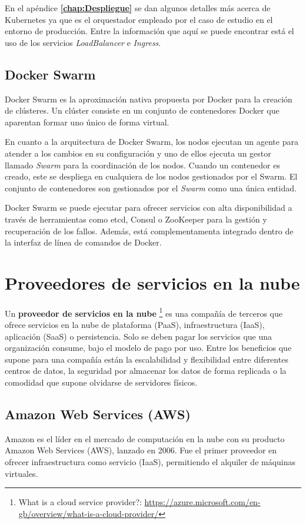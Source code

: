 \documentclass[11pt,spanish,listoffigures]{tfgetsinf}
\begin{document}
En el apéndice \textbf{\ref{chap:Despliegue} } se dan algunos detalles más acerca de Kubernetes ya que es el orquestador empleado por el caso de estudio en el entorno de producción. Entre la información que aquí se puede encontrar está el uso de los servicios \textit{LoadBalancer} e \textit{Ingress}.

\subsection{Docker Swarm}

Docker Swarm \cite{DeAlfonso2017} es la aproximación nativa propuesta por Docker para la creación de clústeres. Un clúster consiste en un conjunto de contenedores Docker que aparentan formar uno único de forma virtual.

En cuanto a la arquitectura de Docker Swarm, los nodos ejecutan un agente para atender a los cambios en su configuración y uno de ellos ejecuta un gestor llamado \textit{Swarm} para la coordinación de los nodos. Cuando un contenedor es creado, este se despliega en cualquiera de los nodos gestionados por el Swarm. El conjunto de contenedores son gestionados por el \textit{Swarm} como una única entidad.

Docker Swarm se puede ejecutar para ofrecer servicios con alta disponibilidad a través de herramientas como etcd, Consul o ZooKeeper para la gestión y recuperación de los fallos. Además, está complementamenta integrado dentro de la interfaz de línea de comandos de Docker.

\section{Proveedores de servicios en la nube}

Un \textbf{proveedor de servicios en la nube} \footnote{ What is a cloud service provider?: \url{https://azure.microsoft.com/en-gb/overview/what-is-a-cloud-provider/}} es una compañía de terceros que ofrece servicios en la nube de plataforma (PaaS), infraestructura (IaaS), aplicación (SaaS) o persistencia. Solo se deben pagar los servicios que una organización consume, bajo el modelo de pago por uso. Entre los beneficios que supone para una compañía están la escalabilidad y flexibilidad entre diferentes centros de datos, la seguridad por almacenar los datos de forma replicada o la comodidad que supone olvidarse de servidores físicos.

\subsection{Amazon Web Services (AWS)}
Amazon es el líder en el mercado de computación en la nube con su producto Amazon Web Services (AWS), lanzado en 2006. Fue el primer proveedor en ofrecer infraestructura como servicio (IaaS), permitiendo el alquiler de máquinas virtuales.
\end{document}
